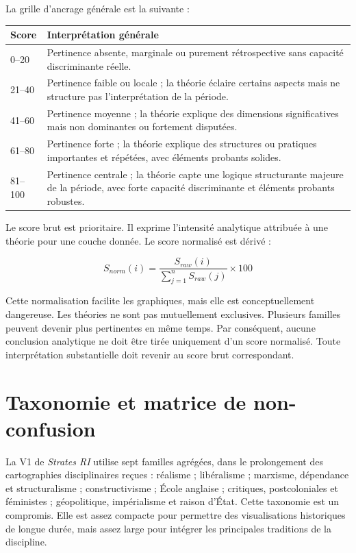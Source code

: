 \documentclass[11pt,a4paper]{article}
\begin{document}
La grille d'ancrage générale est la suivante :

\begin{center}
\begin{tabular}{p{2.2cm}p{10.5cm}}
\hline
Score & Interprétation générale \\
\hline
0--20 & Pertinence absente, marginale ou purement rétrospective sans capacité discriminante réelle. \\
21--40 & Pertinence faible ou locale ; la théorie éclaire certains aspects mais ne structure pas l'interprétation de la période. \\
41--60 & Pertinence moyenne ; la théorie explique des dimensions significatives mais non dominantes ou fortement disputées. \\
61--80 & Pertinence forte ; la théorie explique des structures ou pratiques importantes et répétées, avec éléments probants solides. \\
81--100 & Pertinence centrale ; la théorie capte une logique structurante majeure de la période, avec forte capacité discriminante et éléments probants robustes. \\
\hline
\end{tabular}
\end{center}

Le score brut est prioritaire. Il exprime l'intensité analytique attribuée à une théorie pour une couche donnée. Le score normalisé est dérivé :

\[
S_{norm}(i) = \frac{S_{raw}(i)}{\sum_{j=1}^{n} S_{raw}(j)} \times 100
\]

Cette normalisation facilite les graphiques, mais elle est conceptuellement dangereuse. Les théories ne sont pas mutuellement exclusives. Plusieurs familles peuvent devenir plus pertinentes en même temps. Par conséquent, aucune conclusion analytique ne doit être tirée uniquement d'un score normalisé. Toute interprétation substantielle doit revenir au score brut correspondant.

\section{Taxonomie et matrice de non-confusion}

La V1 de \emph{Strates RI} utilise sept familles agrégées, dans le prolongement des cartographies disciplinaires reçues \citep{battistella2012theories,acharya2019making} : réalisme ; libéralisme ; marxisme, dépendance et structuralisme ; constructivisme ; École anglaise ; critiques, postcoloniales et féministes ; géopolitique, impérialisme et raison d'État. Cette taxonomie est un compromis. Elle est assez compacte pour permettre des visualisations historiques de longue durée, mais assez large pour intégrer les principales traditions de la discipline.
\end{document}
